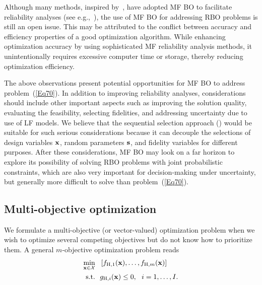 \documentclass[iicol,sn-basic]{sn-jnl}%
\begin{document}
Although many methods, inspired by~\cite{Bichon2008}, have adopted MF BO to facilitate reliability analyses (see e.g.,~\cite{Chaudhuri2021,Patsialis2021,ZhangC2022,AshwinRenganathan2023}), the use of MF BO for addressing RBO problems is still an open issue.
This may be attributed to the conflict between accuracy and efficiency properties of a good optimization algorithm.
While enhancing optimization accuracy by using sophisticated MF reliability analysis methods, it unintentionally requires excessive computer time or storage, thereby reducing optimization efficiency.    

The above observations present potential opportunities for MF BO to address problem~(\ref{Eq70}).
In addition to improving reliability analyses, considerations should include other important aspects such as improving the solution quality, evaluating the feasibility, selecting fidelities, and addressing uncertainty due to use of LF models.
We believe that the sequential selection approach () would be suitable for such serious considerations because it can decouple the selections of design variables $\bf x$, random parameters $\bf s$, and fidelity variables for different purposes.   
After these considerations, MF BO may look on a far horizon to explore its possibility of solving RBO problems with joint probabilistic constraints, which are also very important for decision-making under uncertainty, but generally more difficult to solve than problem~(\ref{Eq70}).

\subsection{Multi-objective optimization}\label{Sec64}

We formulate a multi-objective (or vector-valued) optimization problem when we wish to optimize several competing objectives but do not know how to prioritize them.
A general $m$-objective optimization problem reads
\begin{equation}\label{Eq71}
	\begin{aligned}
		\underset{{\bf x} \in \mathcal{X}}{\min} \ \ & \left[f_{\text{H},1}({\bf x}),\dots,f_{\text{H},m}({\bf x})\right]\\
		\textrm{s.t.} \ \ 
		& g_{\text{H},i}({\bf x}) \leq 0,\ \ i=1,\dots,I. 
	\end{aligned}
\end{equation}
\end{document}
